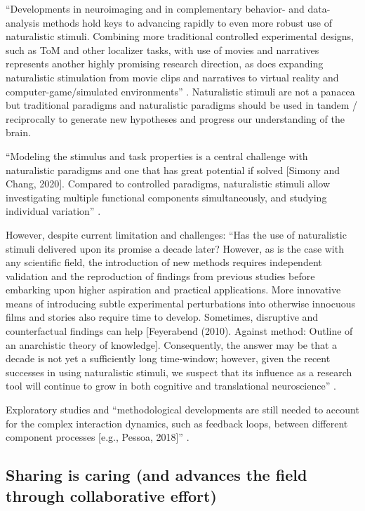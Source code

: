 %
``Developments in neuroimaging and in complementary behavior- and
data-analysis methods hold keys to advancing rapidly to even more robust use of
naturalistic stimuli.
%
Combining more traditional controlled experimental designs, such as ToM and
other localizer tasks, with use of movies and narratives represents another
highly promising research direction, as does expanding naturalistic stimulation
from movie clips and narratives to virtual reality and computer-game/simulated
environments'' \citep{jaaskelainen2021movies}.
%
Naturalistic stimuli are not a panacea but traditional paradigms and
naturalistic paradigms should be used in tandem / reciprocally to generate new
hypotheses and progress our understanding of the brain.

%
``Modeling the stimulus and task properties is a central challenge with
naturalistic paradigms and one that has great potential if solved [Simony and
Chang, 2020].
%
Compared to controlled paradigms, naturalistic stimuli allow investigating
multiple functional components simultaneously, and studying individual
variation'' \citep{saarimaki2021naturalistic}.

However, despite current limitation and challenges:
%
``Has the use of naturalistic stimuli delivered upon its promise a decade later?
%
However, as is the case with any scientific field, the introduction of new
methods requires independent validation and the reproduction of findings from
previous studies before embarking upon higher aspiration and practical
applications.
%
More innovative means of introducing subtle experimental perturbations into
otherwise innocuous films and stories also require time to develop.
%
Sometimes, disruptive and counterfactual findings can help [Feyerabend (2010).
Against method: Outline of an anarchistic theory of knowledge].
%
Consequently, the answer may be that a decade is not yet a sufficiently long
time-window;
%
however, given the recent successes in using naturalistic stimuli, we suspect
that its influence as a research tool will continue to grow in both cognitive
and translational neuroscience'' \citep{sonkusare2019naturalistic}.

%
Exploratory studies and ``methodological developments are still needed to
account for the complex interaction dynamics, such as feedback loops, between
different component processes [e.g., Pessoa, 2018]''
\citep{saarimaki2021naturalistic}.





\subsection{Sharing is caring (and advances the field through collaborative
effort)}

